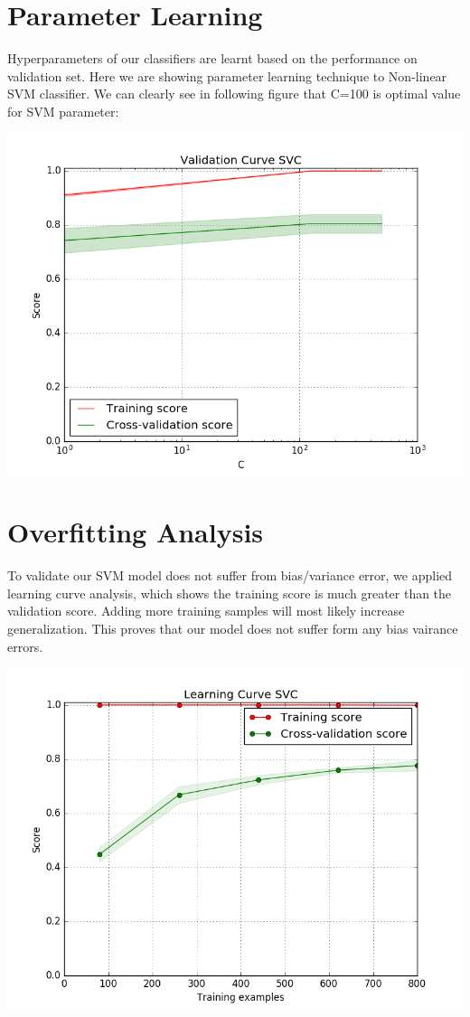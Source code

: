 \documentclass[conference]{IEEEtran}
\begin{document}
\section{Parameter Learning}
\label{sec:Results}

Hyperparameters of our classifiers are learnt based on the performance on validation set. Here we are showing parameter learning technique to Non-linear SVM classifier. We can clearly see in following figure that C=100 is optimal value for SVM parameter:

\includegraphics[width=\columnwidth]{validation}
\section{Overfitting Analysis}
To validate our SVM model does not suffer from bias/variance error, we applied learning curve analysis, which shows the training score is much greater than the validation score. Adding more training samples will most likely increase generalization. This proves that our model does not suffer form any bias vairance errors. 

\includegraphics[width=\columnwidth]{learning}
\end{document}

